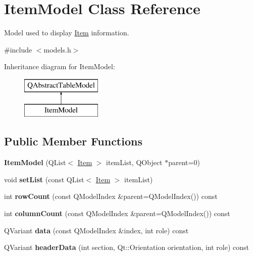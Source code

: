 \hypertarget{class_item_model}{}\section{Item\+Model Class Reference}
\label{class_item_model}


Model used to display \mbox{\hyperlink{class_item}{Item}} information.  




{\ttfamily \#include $<$models.\+h$>$}

Inheritance diagram for Item\+Model\+:\begin{figure}[H]
\begin{center}
\leavevmode
\includegraphics[height=2.000000cm]{class_item_model}
\end{center}
\end{figure}
\subsection*{Public Member Functions}
\begin{DoxyCompactItemize}
\item 
\mbox{\label{class_item_model_ac7f87167bc2f0d34ab48a04807b4a3d5}} 
{\bfseries Item\+Model} (Q\+List$<$ \mbox{\hyperlink{class_item}{Item}} $>$ item\+List, Q\+Object $\ast$parent=0)
\item 
\mbox{\label{class_item_model_a22a570830b9434396f128a27d0aafa02}} 
void {\bfseries set\+List} (const Q\+List$<$ \mbox{\hyperlink{class_item}{Item}} $>$ item\+List)
\item 
\mbox{\label{class_item_model_a91241854ee5a755a5ccae0e177f4a080}} 
int {\bfseries row\+Count} (const Q\+Model\+Index \&parent=Q\+Model\+Index()) const
\item 
\mbox{\label{class_item_model_a217a5b250e2125daf7527f29597c1741}} 
int {\bfseries column\+Count} (const Q\+Model\+Index \&parent=Q\+Model\+Index()) const
\item 
\mbox{\label{class_item_model_a434533c6c4a038db2a4d04bbef51a9dd}} 
Q\+Variant {\bfseries data} (const Q\+Model\+Index \&index, int role) const
\item 
\mbox{\label{class_item_model_ae9df59dfb1f992e7ab244fa8c6240a72}} 
Q\+Variant {\bfseries header\+Data} (int section, Qt\+::\+Orientation orientation, int role) const
\end{DoxyCompactItemize}
